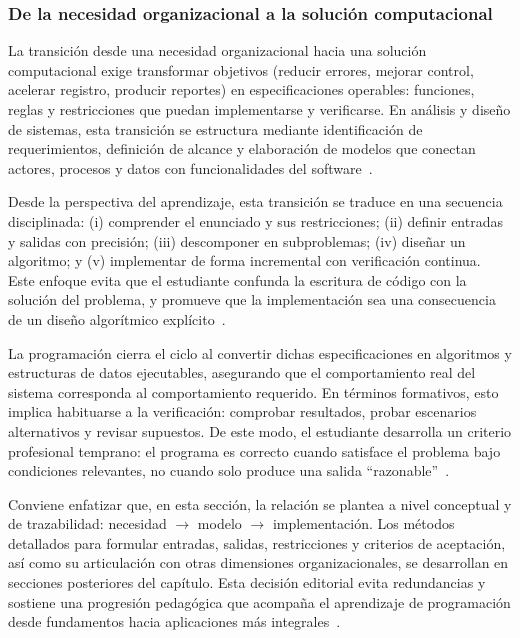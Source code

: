 \documentclass[12pt,twoside]{book}
\begin{document}
					\subsubsection{De la necesidad organizacional a la solución computacional}
						\noindent
						La transición desde una necesidad organizacional hacia una solución computacional exige transformar objetivos (reducir errores, mejorar control, acelerar registro, producir reportes) en especificaciones operables: funciones, reglas y restricciones que puedan implementarse y verificarse. En análisis y diseño de sistemas, esta transición se estructura mediante identificación de requerimientos, definición de alcance y elaboración de modelos que conectan actores, procesos y datos con funcionalidades del software~\cite{Kendall2014Systems,Tegarden2025Systems,Laudon2020Management}.
						
						Desde la perspectiva del aprendizaje, esta transición se traduce en una secuencia disciplinada: (i) comprender el enunciado y sus restricciones; (ii) definir entradas y salidas con precisión; (iii) descomponer en subproblemas; (iv) diseñar un algoritmo; y (v) implementar de forma incremental con verificación continua. Este enfoque evita que el estudiante confunda la escritura de código con la solución del problema, y promueve que la implementación sea una consecuencia de un diseño algorítmico explícito~\cite{Hanly2015Problem,Wirth1976Algorithms,Gaddis2022Starting}.
						
						La programación cierra el ciclo al convertir dichas especificaciones en algoritmos y estructuras de datos ejecutables, asegurando que el comportamiento real del sistema corresponda al comportamiento requerido. En términos formativos, esto implica habituarse a la verificación: comprobar resultados, probar escenarios alternativos y revisar supuestos. De este modo, el estudiante desarrolla un criterio profesional temprano: el programa es correcto cuando satisface el problema bajo condiciones relevantes, no cuando solo produce una salida “razonable”~\cite{Ghezzi2003Fundamentals,Fitzpatrick2004Software,Wirth1976Algorithms}.
						
						Conviene enfatizar que, en esta sección, la relación se plantea a nivel conceptual y de trazabilidad: necesidad $\rightarrow$ modelo $\rightarrow$ implementación. Los métodos detallados para formular entradas, salidas, restricciones y criterios de aceptación, así como su articulación con otras dimensiones organizacionales, se desarrollan en secciones posteriores del capítulo. Esta decisión editorial evita redundancias y sostiene una progresión pedagógica que acompaña el aprendizaje de programación desde fundamentos hacia aplicaciones más integrales~\cite{Kendall2014Systems,Tegarden2025Systems,Leidig2021Competency}.
				
\end{document}
